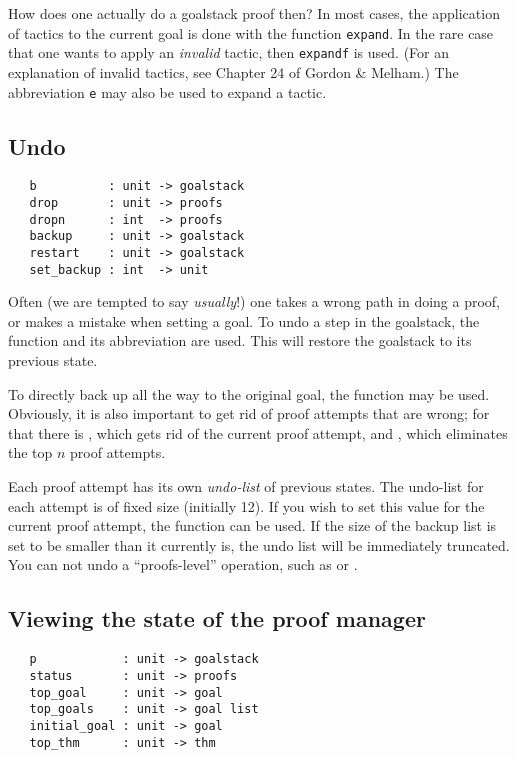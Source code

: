 {How does one actually do a goalstack proof then? In most cases, the
application of tactics to the current goal is done with the function
\verb+expand+. In the rare case that one wants to apply an
{\it invalid\/} tactic, then \verb+expandf+ is used. (For an
explanation of invalid tactics, see Chapter 24 of Gordon \& Melham.) The
abbreviation \verb+e+ may also be used to expand a tactic.


\subsection{Undo}

\begin{hol}
\begin{verbatim}
   b          : unit -> goalstack
   drop       : unit -> proofs
   dropn      : int  -> proofs
   backup     : unit -> goalstack
   restart    : unit -> goalstack
   set_backup : int  -> unit
\end{verbatim}
\end{hol}

Often (we are tempted to say {\it usually}!) one takes a wrong path
in doing a proof, or makes a mistake when setting a goal. To undo a step
in the goalstack, the function  and its abbreviation
 are used. This will restore the goalstack to its previous
state.


To directly back up all the way to the original goal, the function
 may be used. Obviously, it is also important to get
rid of proof attempts that are wrong; for that there is ,
which gets rid of the current proof attempt, and , which
eliminates the top $n$ proof attempts.


Each proof attempt has its own \emph{undo-list} of previous
states. The undo-list for each attempt is of fixed size (initially
12). If you wish to set this value for the current proof attempt, the
function  can be used. If the size of the backup
list is set to be smaller than it currently is, the undo list will be
immediately truncated. You can not undo a ``proofs-level'' operation, such
as  or .

\subsection{Viewing the state of the proof manager}

\begin{hol}
\begin{verbatim}
   p            : unit -> goalstack
   status       : unit -> proofs
   top_goal     : unit -> goal
   top_goals    : unit -> goal list
   initial_goal : unit -> goal
   top_thm      : unit -> thm
\end{verbatim}
\end{hol}

}
